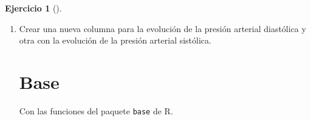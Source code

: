 \documentclass[
  spanish,
  a4paper,
]{scrreport}
\newenvironment{Shaded}{\begin{snugshade}}{\end{snugshade}}
\newcommand{\AttributeTok}[1]{\textcolor[rgb]{0.40,0.45,0.13}{#1}}
\newcommand{\DecValTok}[1]{\textcolor[rgb]{0.68,0.00,0.00}{#1}}
\newcommand{\FunctionTok}[1]{\textcolor[rgb]{0.28,0.35,0.67}{#1}}
\newcommand{\NormalTok}[1]{\textcolor[rgb]{0.00,0.23,0.31}{#1}}
\newcommand{\OtherTok}[1]{\textcolor[rgb]{0.00,0.23,0.31}{#1}}
\newcommand{\SpecialCharTok}[1]{\textcolor[rgb]{0.37,0.37,0.37}{#1}}
\theoremstyle{definition}
\newtheorem{exercise}{Ejercicio}[chapter]
\theoremstyle{remark}
\begin{document}
\begin{exercise}[]
\begin{enumerate}
\begin{tcolorbox}
  \section{tidyverse}

  Con la función \texttt{mutate} del paquete \texttt{dplyr} de
  \texttt{tidyverse}.

\begin{Shaded}
\begin{Highlighting}[]
\NormalTok{df }\OtherTok{\textless{}{-}}\NormalTok{ df }\SpecialCharTok{|\textgreater{}} \FunctionTok{mutate}\NormalTok{(}\AttributeTok{IMC =}\NormalTok{ PESO}\SpecialCharTok{/}\NormalTok{(ALTURA}\SpecialCharTok{/}\DecValTok{100}\NormalTok{)}\SpecialCharTok{\^{}}\DecValTok{2}\NormalTok{)}
\FunctionTok{head}\NormalTok{(df }\SpecialCharTok{|\textgreater{}} \FunctionTok{select}\NormalTok{(PESO, ALTURA, IMC))}
\end{Highlighting}
\end{Shaded}

\begin{verbatim}
# A tibble: 6 x 3
   PESO ALTURA   IMC
  <dbl>  <dbl> <dbl>
1    78    165  28.7
2    74    154  31.2
3    81    156  33.3
4    82    181  25.0
5    78    184  23.0
6    80    179  25.0
\end{verbatim}

  \end{tcolorbox}
\item
  Crear una nueva columna para la evolución de la presión arterial
  diastólica y otra con la evolución de la presión arterial sistólica.

  \begin{tcolorbox}[enhanced jigsaw, titlerule=0mm, arc=.35mm, rightrule=.15mm, opacitybacktitle=0.6, leftrule=.75mm, colframe=quarto-callout-tip-color-frame, toptitle=1mm, breakable, colbacktitle=quarto-callout-tip-color!10!white, bottomrule=.15mm, colback=white, left=2mm, bottomtitle=1mm, opacityback=0, title=\textcolor{quarto-callout-tip-color}{\faLightbulb}\hspace{0.5em}{Solución}, toprule=.15mm, coltitle=black]

  \section{Base}

  Con las funciones del paquete \texttt{base} de R.


\end{tcolorbox}
\end{enumerate}
\end{exercise}
\end{document}
